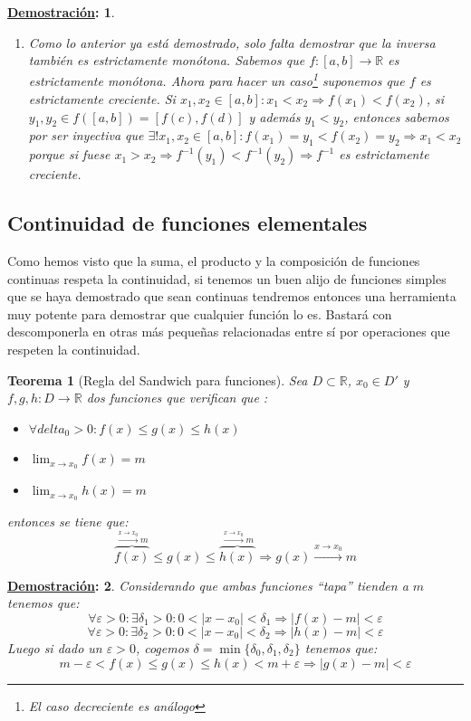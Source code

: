 \documentclass[10pt,a4paper,openright]{book}
\theoremstyle{break}
\newtheorem*{theo}{Teorema}
\newtheorem*{demo}{\underline{Demostración}:}
\begin{document}
\begin{demo}
\begin{enumerate}
\item Como lo anterior ya está demostrado, solo falta demostrar que la inversa también es estrictamente monótona. Sabemos que $f: [a,b]\rightarrow \mathbb R$ es estrictamente monótona. Ahora para hacer un caso\footnote{El caso decreciente es análogo} suponemos que $f$ es estrictamente creciente. Si $x_1,x_2\in [a,b]: x_1<x_2\Rightarrow f(x_1)<f(x_2)$, si $y_1,y_2\in f([a,b])=[f(c), f(d)]$ y además $y_1<y_2$, entonces sabemos por ser inyectiva que $\exists! x_1, x_2\in [a,b]: f(x_1)=y_1 < f(x_2)=y_2\Rightarrow x_1< x_2$ porque si fuese $x_1>x_2\Rightarrow f^{-1}(y_1)<f^{-1}(y_2)\Rightarrow f^{-1}$ es estrictamente creciente.
\end{enumerate} 
\end{demo}

\subsection{Continuidad de funciones elementales}
Como hemos visto que la suma, el producto y la composición de funciones continuas respeta la continuidad, si tenemos un buen alijo de funciones simples que se haya demostrado que sean continuas tendremos entonces una herramienta muy potente para demostrar que cualquier función lo es. Bastará con descomponerla en otras más pequeñas relacionadas entre sí por operaciones que respeten la continuidad.

\begin{theo}[Regla del Sandwich para funciones]
Sea $D\subset \mathbb R$, $x_0\in D'$ y $f,g,h: D\rightarrow\mathbb R$ dos funciones que verifican que :
\begin{itemize}
\item $\forall delta_0>0 : f(x)\leq g(x)\leq h(x)$
\item $\lim_{x\rightarrow x_0} f(x)=m$
\item $\lim_{x\rightarrow x_0} h(x) = m$
\end{itemize}
entonces se tiene que:
$$\overbrace{f(x)}^{\xrightarrow{x\rightarrow x_0} m} \leq g(x)\leq \overbrace{h(x)}^{\xrightarrow{x\rightarrow x_0}m}\Rightarrow g(x)\xrightarrow{x\rightarrow x_0}m$$
\end{theo}
\begin{demo}
Considerando que ambas funciones ``tapa'' tienden a $m$ tenemos que:
$$\forall \varepsilon>0 : \exists \delta_1>0 : 0<|x-x_0|<\delta_1\Rightarrow |f(x)-m|<\varepsilon$$
$$\forall \varepsilon>0: \exists \delta_2>0: 0<|x-x_0|<\delta_2\Rightarrow |h(x)-m|<\varepsilon$$
Luego si dado un $\varepsilon>0$, cogemos $\delta=\min\{\delta_0, \delta_1,\delta_2\}$ tenemos que:
$$m-\varepsilon< f(x) \leq g(x) \leq h(x) < m+\varepsilon\Rightarrow |g(x)-m|<\varepsilon$$
\end{demo}
\end{document}
